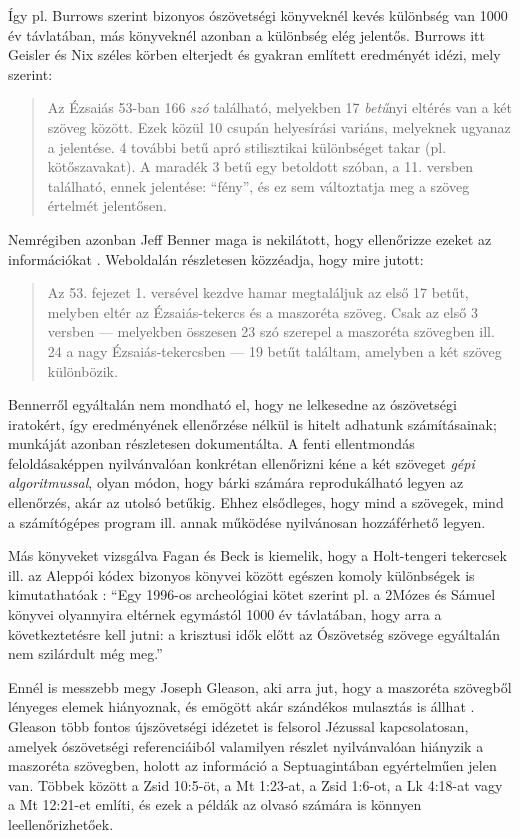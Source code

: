 \documentclass{article}
\begin{document}
Így pl. Burrows szerint \cite[304. o.]{Burrows} bizonyos ószövetségi könyveknél kevés különbség van 1000 év távlatában,
más könyveknél azonban a különbség elég jelentős. Burrows itt Geisler és Nix széles körben
elterjedt és gyakran említett eredményét idézi, mely szerint:
\begin{quote}
Az Ézsaiás 53-ban 166 \textit{szó}
található, melyekben 17 \textit{betű}nyi eltérés van a két szöveg között.
Ezek közül 10 csupán helyesírási variáns, melyeknek ugyanaz a jelentése.
4 további betű apró stilisztikai különbséget takar (pl. kötőszavakat).
A maradék 3 betű egy betoldott szóban, a 11. versben található, ennek jelentése: ``fény'',
és ez sem változtatja meg a szöveg értelmét jelentősen. \cite[263. o.]{GeislerNix}
\end{quote}
Nemrégiben azonban Jeff Benner maga is nekilátott, hogy ellenőrizze ezeket az információkat
\cite{Benner}. Weboldalán részletesen közzéadja, hogy mire jutott:
\begin{quote}Az 53. fejezet 1. versével kezdve hamar megtaláljuk az első 17 betűt,
melyben eltér az Ézsaiás-tekercs és a maszoréta szöveg. Csak az első 3 versben ---
melyekben összesen 23 szó szerepel a maszoréta szövegben ill. 24 a nagy Ézsaiás-tekercsben ---
19 betűt találtam, amelyben a két szöveg különbözik.
\end{quote}
Bennerről egyáltalán nem mondható el, hogy ne lelkesedne az ószövetségi iratokért,
így eredményének ellenőrzése nélkül is hitelt adhatunk számításainak; munkáját azonban
részletesen dokumentálta. A fenti ellentmondás
feloldásaképpen nyilvánvalóan konkrétan ellenőrizni kéne a két szöveget \textit{gépi algoritmussal},
olyan módon, hogy bárki számára reprodukálható legyen az ellenőrzés, akár az utolsó
betűkig. Ehhez elsődleges,
hogy mind a szövegek, mind a számítógépes program ill. annak működése nyilvánosan
hozzáférhető legyen.

Más könyveket vizsgálva Fagan és Beck is kiemelik, hogy 
a Holt-tengeri tekercsek ill. az Aleppói kódex bizonyos könyvei között egészen komoly különbségek is
kimutathatóak \cite{FaganBeck}: ``Egy 1996-os archeológiai kötet szerint pl. a 2Mózes és
Sámuel könyvei olyannyira eltérnek egymástól 1000 év távlatában, hogy
arra a következtetésre kell jutni: a krisztusi idők előtt az Ószövetség
szövege egyáltalán nem szilárdult még meg.''

Ennél is messzebb megy Joseph Gleason, aki arra jut, hogy a maszoréta szövegből lényeges
elemek hiányoznak, és emögött akár szándékos mulasztás is állhat \cite{Gleason}.
Gleason több fontos újszövetségi idézetet is felsorol Jézussal kapcsolatosan, amelyek ószövetségi
referenciáiból valamilyen
részlet nyilvánvalóan hiányzik a maszoréta szövegben, holott az információ a Septuagintában
egyértelműen jelen van. Többek között a Zsid 10:5-öt, a Mt 1:23-at, a Zsid 1:6-ot, a Lk 4:18-at
vagy a Mt 12:21-et említi, és ezek a példák az olvasó számára is könnyen leellenőrizhetőek.
\end{document}
